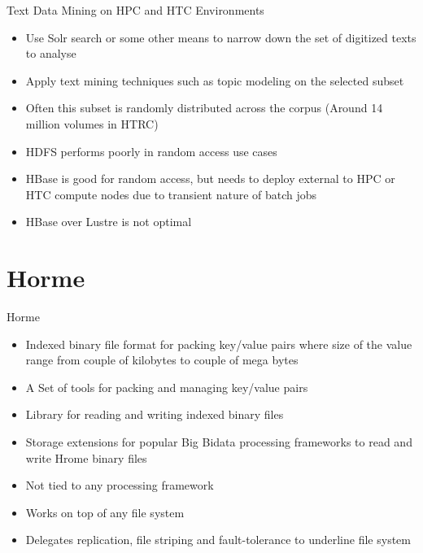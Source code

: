 \documentclass[newPxFont]{beamer}
\begin{document}
\begin{frame}[c]{Text Data Mining on HPC and HTC Environments}
  \begin{itemize}
    \item Use Solr search or some other means to narrow down the set of digitized texts to analyse
    \item Apply text mining techniques such as topic modeling on the selected subset
    \item Often this subset is randomly distributed across the corpus (Around 14 million volumes in HTRC)
    \item HDFS performs poorly in random access use cases
    \item HBase is good for random access, but needs to deploy external to HPC or HTC compute nodes due to transient nature of batch jobs
    \item HBase over Lustre is not optimal
  \end{itemize}
\end{frame}

\section{Horme}

\begin{frame}[c]{Horme}
\begin{itemize}
  \item Indexed binary file format for packing key/value pairs where size of the value range from couple of kilobytes to couple of mega bytes
  \item A Set of tools for packing and managing key/value pairs  
  \item Library for reading and writing indexed binary files 
  \item Storage extensions for popular Big Bidata processing frameworks to read and write Hrome binary files
  \item Not tied to any processing framework
  \item Works on top of any file system
  \item Delegates replication, file striping and fault-tolerance to underline file system
\end{itemize}
\end{frame}
\end{document}
